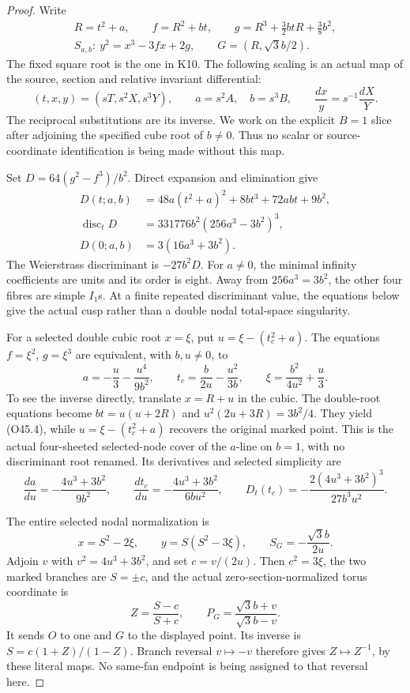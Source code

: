 \begin{proof}
Write
\[
\begin{gathered}
 R=t^2+a,\qquad f=R^2+bt,\qquad
 g=R^3+\frac32btR+\frac38b^2,\\
 S_{a,b}:\ y^2=x^3-3fx+2g,\qquad
 G=(R,\sqrt3 b/2).
 \end{gathered}
\tag{O45.1}
\]
The fixed square root is the one in K10. The following scaling is an
actual map of the source, section and relative invariant differential:
\[
 (t,x,y)=(sT,s^2X,s^3Y),\qquad
 a=s^2A,\quad b=s^3B,\qquad
 \frac{dx}{y}=s^{-1}\frac{dX}{Y}.
 \tag{O45.2}
\]
The reciprocal substitutions are its inverse. We work on the
explicit \(B=1\) slice after adjoining the specified cube root of
\(b\ne0\). Thus no scalar or source-coordinate identification is
being made without this map.

Set \(D=64(g^2-f^3)/b^2\). Direct expansion and elimination give
\[
\begin{split}
 D(t;a,b)&=48a(t^2+a)^2+8bt^3+72abt+9b^2,\\
 \operatorname{disc}_tD&=331776b^2(256a^3-3b^2)^3,\\
 D(0;a,b)&=3(16a^3+3b^2).
 \end{split}
\tag{O45.3}
\]
The Weierstrass discriminant is \(-27b^2D\). For \(a\ne0\),
the minimal infinity coefficients are units and its order is eight.
Away from \(256a^3=3b^2\), the other four fibres are simple \(I_1\)\textquotesingle s.
At a finite repeated discriminant value, the equations below give
the actual cusp rather than a double nodal total-space singularity.

For a selected double cubic root \(x=\xi\), put
\(u=\xi-(t_c^2+a)\). The equations \(f=\xi^2\), \(g=\xi^3\)
are equivalent, with \(b,u\ne0\), to
\[
 a=-\frac u3-\frac{u^4}{9b^2},\qquad
 t_c=\frac b{2u}-\frac{u^2}{3b},\qquad
 \xi=\frac{b^2}{4u^2}+\frac u3.
 \tag{O45.4}
\]
To see the inverse directly, translate \(x=R+u\) in the cubic.
The double-root equations become
\(bt=u(u+2R)\) and \(u^2(2u+3R)=3b^2/4\). They yield
(O45.4), while \(u=\xi-(t_c^2+a)\) recovers the original marked
point. This is the actual four-sheeted selected-node cover of
the \(a\)-line on \(b=1\), with no discriminant root renamed.
Its derivatives and selected simplicity are
\[
 \frac{da}{du}=-\frac{4u^3+3b^2}{9b^2},\qquad
 \frac{dt_c}{du}=-\frac{4u^3+3b^2}{6bu^2},\qquad
 D_t(t_c)=-\frac{2(4u^3+3b^2)^3}{27b^3u^2}.
 \tag{O45.5}
\]

The entire selected nodal normalization is
\[
 x=S^2-2\xi,\qquad y=S(S^2-3\xi),\qquad
 S_G=-\frac{\sqrt3 b}{2u}.
 \tag{O45.6}
\]
Adjoin \(v\) with \(v^2=4u^3+3b^2\), and set \(c=v/(2u)\).
Then \(c^2=3\xi\), the two marked branches are \(S=\pm c\),
and the actual zero-section-normalized torus coordinate is
\[
 Z=\frac{S-c}{S+c},\qquad
 P_G=\frac{\sqrt3 b+v}{\sqrt3 b-v}.
 \tag{O45.7}
\]
It sends \(O\) to one and \(G\) to the displayed point. Its
inverse is \(S=c(1+Z)/(1-Z)\). Branch reversal \(v\mapsto-v\)
therefore gives \(Z\mapsto Z^{-1}\), by these literal maps.
No same-fan endpoint is being assigned to that reversal here.


\end{proof}
